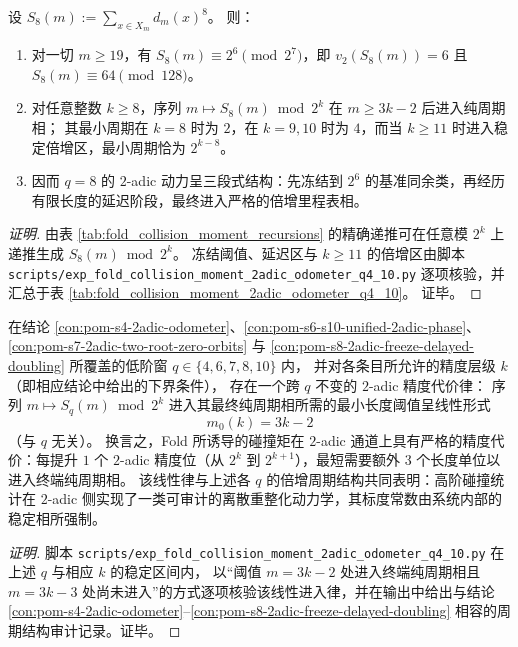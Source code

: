 \begin{conclusion}[\texorpdfstring{$q=8$}{q=8} 的高阶冻结与延迟倍增：基准同余类为 \texorpdfstring{$2^6$}{64}]\label{con:pom-s8-2adic-freeze-delayed-doubling}
设 \(S_8(m):=\sum_{x\in X_m} d_m(x)^8\)。
则：
\begin{enumerate}
  \item 对一切 \(m\ge 19\)，有 \(S_8(m)\equiv 2^6\pmod{2^7}\)，即 \(v_2(S_8(m))=6\) 且 \(S_8(m)\equiv 64\pmod{128}\)。
  \item 对任意整数 \(k\ge 8\)，序列 \(m\mapsto S_8(m)\bmod 2^k\) 在 \(m\ge 3k-2\) 后进入纯周期相；
  其最小周期在 \(k=8\) 时为 \(2\)，在 \(k=9,10\) 时为 \(4\)，而当 \(k\ge 11\) 时进入稳定倍增区，最小周期恰为 \(2^{k-8}\)。
  \item 因而 \(q=8\) 的 \(2\)-adic 动力呈三段式结构：先冻结到 \(2^6\) 的基准同余类，再经历有限长度的延迟阶段，最终进入严格的倍增里程表相。
\end{enumerate}
\end{conclusion}
\begin{proof}[证明]
由表 \ref{tab:fold_collision_moment_recursions} 的精确递推可在任意模 \(2^k\) 上递推生成 \(S_8(m)\bmod 2^k\)。
冻结阈值、延迟区与 \(k\ge 11\) 的倍增区由脚本 \texttt{scripts/exp\_fold\_collision\_moment\_2adic\_odometer\_q4\_10.py} 逐项核验，并汇总于表 \ref{tab:fold_collision_moment_2adic_odometer_q4_10}。
证毕。
\end{proof}

\begin{conclusion}[三步换一位的普适代价：\(2\)-adic 稳定相的进入阈值恒为 \texorpdfstring{$m=3k-2$}{m=3k-2}]\label{con:pom-collision-moment-2adic-threshold-3k-2}
在结论 \ref{con:pom-s4-2adic-odometer}、\ref{con:pom-s6-s10-unified-2adic-phase}、\ref{con:pom-s7-2adic-two-root-zero-orbits} 与 \ref{con:pom-s8-2adic-freeze-delayed-doubling}
所覆盖的低阶窗 \(q\in\{4,6,7,8,10\}\) 内，
并对各条目所允许的精度层级 \(k\)（即相应结论中给出的下界条件），
存在一个跨 \(q\) 不变的 \(2\)-adic 精度代价律：
序列 \(m\mapsto S_q(m)\bmod 2^k\) 进入其最终纯周期相所需的最小长度阈值呈线性形式
\[
m_0(k)=3k-2
\]
（与 \(q\) 无关）。
换言之，Fold 所诱导的碰撞矩在 \(2\)-adic 通道上具有严格的精度代价：每提升 \(1\) 个 \(2\)-adic 精度位（从 \(2^k\) 到 \(2^{k+1}\)），最短需要额外 \(3\) 个长度单位以进入终端纯周期相。
该线性律与上述各 \(q\) 的倍增周期结构共同表明：高阶碰撞统计在 \(2\)-adic 侧实现了一类可审计的离散重整化动力学，其标度常数由系统内部的稳定相所强制。
\end{conclusion}
\begin{proof}[证明]
脚本 \texttt{scripts/exp\_fold\_collision\_moment\_2adic\_odometer\_q4\_10.py} 在上述 \(q\) 与相应 \(k\) 的稳定区间内，
以“阈值 \(m=3k-2\) 处进入终端纯周期相且 \(m=3k-3\) 处尚未进入”的方式逐项核验该线性进入律，并在输出中给出与结论 \ref{con:pom-s4-2adic-odometer}--\ref{con:pom-s8-2adic-freeze-delayed-doubling} 相容的周期结构审计记录。证毕。
\end{proof}


